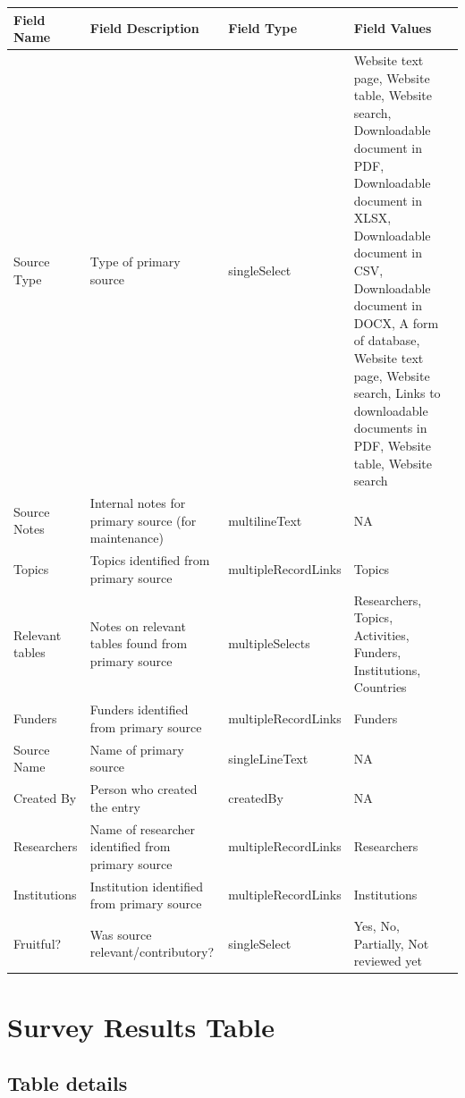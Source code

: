 \documentclass[
]{book}
\begin{document}
\begin{table}
\centering
\begin{tabular}{l|l|l|l}
\hline
\textbf{Field Name} & \textbf{Field Description} & \textbf{Field Type} & \textbf{Field Values}\\
\hline
Source Type & Type of primary source & singleSelect & Website text page, Website table, Website search, Downloadable document in PDF, Downloadable document in XLSX, Downloadable document in CSV, Downloadable document in DOCX, A form of database, Website text page, Website search, Links to downloadable documents in PDF, Website table, Website search\\
\hline
Source Notes & Internal notes for primary source (for maintenance) & multilineText & NA\\
\hline
Topics & Topics identified from primary source & multipleRecordLinks & Topics\\
\hline
Relevant tables & Notes on relevant tables found from primary source & multipleSelects & Researchers, Topics, Activities, Funders, Institutions, Countries\\
\hline
Funders & Funders identified from primary source & multipleRecordLinks & Funders\\
\hline
Source Name & Name of primary source & singleLineText & NA\\
\hline
Created By & Person who created the entry & createdBy & NA\\
\hline
Researchers & Name of researcher identified from primary source & multipleRecordLinks & Researchers\\
\hline
Institutions & Institution identified from primary source & multipleRecordLinks & Institutions\\
\hline
Fruitful? & Was source relevant/contributory? & singleSelect & Yes, No, Partially, Not reviewed yet\\
\hline
\end{tabular}
\end{table}

\hypertarget{survey-results-table}{%
\section{Survey Results Table}\label{survey-results-table}}

\hypertarget{table-details-8}{%
\subsection{Table details}\label{table-details-8}}
\end{document}
